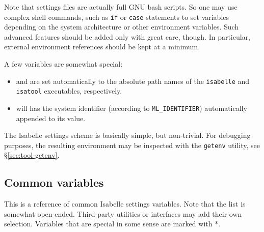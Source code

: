 Note that settings files are actually full GNU bash scripts. So one may use
complex shell commands, such as \texttt{if} or \texttt{case} statements to set
variables depending on the system architecture or other environment variables.
Such advanced features should be added only with great care, though. In
particular, external environment references should be kept at a minimum.

\medskip A few variables are somewhat special:
\begin{itemize}
\item {} and  are set automatically to
  the absolute path names of the \texttt{isabelle} and
  \texttt{isatool} executables, respectively.
  
\item {} will has the {\ML} system identifier (according
  to \texttt{ML_IDENTIFIER}) automatically appended to its value.
\end{itemize}

\medskip The Isabelle settings scheme is basically simple, but non-trivial.
For debugging purposes, the resulting environment may be inspected with the
\texttt{getenv} utility, see \S\ref{sec:tool-getenv}.


\subsection{Common variables}

This is a reference of common Isabelle settings variables. Note that the list
is somewhat open-ended. Third-party utilities or interfaces may add their own
selection. Variables that are special in some sense are marked with *.

